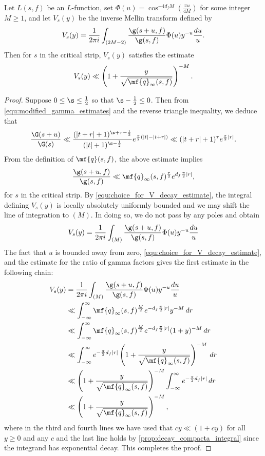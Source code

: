     \begin{proposition}\label{prop:V_function_decay}
      Let $L(s,f)$ be an $L$-function, set $\Phi(u) = \cos^{-4d_{f}M}\left(\frac{\pi u}{4M}\right)$ for some integer $M \ge 1$, and let $V_{s}(y)$ be the inverse Mellin transform defined by
      \[
        V_{s}(y) = \frac{1}{2\pi i}\int_{(2M-2)}\frac{\g(s+u,f)}{\g(s,f)}\Phi(u)y^{-u}\frac{du}{u}.
      \]
      Then for $s$ in the critical strip, $V_{s}(y)$ satisfies the estimate
      \[
        V_{s}(y) \ll \left(1+\frac{y}{\sqrt{\mf{q}_{\infty}(s,f)}}\right)^{-M}.
      \]
    \end{proposition}
    \begin{proof}
      Suppose $0 \le \s \le \frac{1}{2}$ so that $\s-\frac{1}{2} \le 0$. Then from \cref{equ:modified_gamma_estimates} and the reverse triangle inequality, we deduce that
      \[
        \frac{\G(s+u)}{\G(s)} \ll \frac{(|t+r|+1)^{\s+\tau-\frac{1}{2}}}{(|t|+1)^{\s-\frac{1}{2}}}e^{\frac{\pi}{2}(|t|-|t+r|)} \ll (|t+r|+1)^{\tau}e^{\frac{\pi}{2}|r|}.
      \]
      From the definition of $\mf{q}(s,f)$, the above estimate implies
      \[
        \frac{\g(s+u,f)}{\g(s,f)} \ll \mf{q}_{\infty}(s,f)^{\frac{\tau}{2}}e^{d_{f}\frac{\pi}{2}|r|},
      \]
      for $s$ in the critical strip. By \cref{equ:choice_for_V_decay_estimate}, the integral defining $V_{s}(y)$ is locally absolutely uniformly bounded and we may shift the line of integration to $(M)$. In doing so, we do not pass by any poles and obtain
      \[
        V_{s}(y) = \frac{1}{2\pi i}\int_{(M)}\frac{\g(s+u,f)}{\g(s,f)}\Phi(u)y^{-u}\frac{du}{u} \\
      \]
      The fact that $u$ is bounded away from zero, \cref{equ:choice_for_V_decay_estimate}, and the estimate for the ratio of gamma factors gives the first estimate in the following chain:
      \begin{align*}
        V_{s}(y) &= \frac{1}{2\pi i}\int_{(M)}\frac{\g(s+u,f)}{\g(s,f)}\Phi(u)y^{-u}\frac{du}{u} \\
        &\ll \int_{-\infty}^{\infty}\mf{q}_{\infty}(s,f)^{\frac{M}{2}}e^{-d_{f}\frac{\pi}{2}|r|}y^{-M}\,dr \\
        &\ll \int_{-\infty}^{\infty}\mf{q}_{\infty}(s,f)^{\frac{M}{2}}e^{-d_{f}\frac{\pi}{2}|r|}(1+y)^{-M}\,dr \\
        &\ll \int_{-\infty}^{\infty}e^{-\frac{\pi}{2}d_{f}|r|}\left(1+\frac{y}{\sqrt{\mf{q}_{\infty}(s,f)}}\right)^{-M}\,dr \\
        &\ll \left(1+\frac{y}{\sqrt{\mf{q}_{\infty}(s,f)}}\right)^{-M}\int_{-\infty}^{\infty}e^{-\frac{\pi}{2}d_{f}|r|}\,dr \\
        &\ll \left(1+\frac{y}{\sqrt{\mf{q}_{\infty}(s,f)}}\right)^{-M},
      \end{align*}
      where in the third and fourth lines we have used that $cy \ll (1+cy)$ for all $y \ge 0$ and any $c$ and the last line holds by \cref{prop:decay_compacta_integral} since the integrand has exponential decay. This completes the proof.
    \end{proof}

